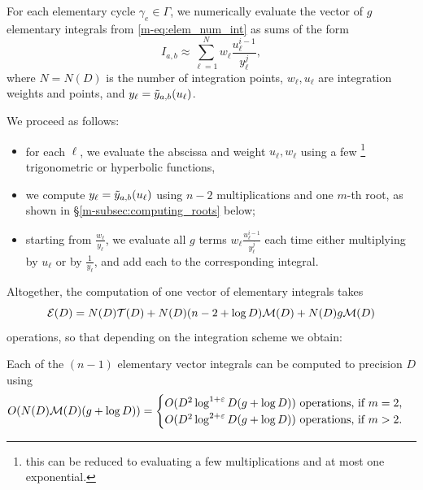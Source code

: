 \documentclass[main.tex]{subfiles}
\begin{document}
   For each elementary cycle $\gamma_e\in \Gamma$, we numerically evaluate the vector of $g$
   elementary integrals from \eqref{m-eq:elem_num_int} as sums of the form
   \begin{equation*}
       I_{a,b} \approx \sum_{\ell=1}^N w_\ell\frac{u_\ell^{i-1}}{y_\ell^j},
   \end{equation*}
   where $N = N(D)$ is the number of integration points, $w_\ell,u_\ell$ are integration weights and points,
   and $y_\ell=\tilde{y}_{a,b}(u_\ell)$.

   We proceed as follows:
   \begin{itemize}
   \item for each $\ell$, we evaluate the abscissa and weight $u_\ell,w_\ell$ using
       a few \footnote{this can be reduced to evaluating
           a few multiplications and at most one exponential.} trigonometric or hyperbolic functions,
   \item we compute $y_\ell=\tilde{y}_{a,b}(u_\ell)$ using $n-2$ multiplications and one $m$-th root,
       as shown in \S \ref{m-subsec:computing_roots} below;
   \item starting from $\frac{w_\ell}{y_\ell}$, we evaluate all $g$ terms $w_\ell\frac{u_\ell^{i-1}}{y_\ell^j}$
       each time either multiplying by $u_\ell$ or by $\frac{1}{y_\ell}$, and add each to the corresponding
       integral.
   \end{itemize}

   Altogether, the computation of one vector of elementary integrals takes
   \begin{equation}\label{eq:elem_int_complexity}
    \mathcal E(D) = N(D)\mathcal T(D)+N(D)(n-2+\log D)\mathcal M(D)+N(D)g\mathcal M(D)
   \end{equation}
    operations,
   so that depending on the integration scheme we obtain:
   \begin{thm}\label{thm:complexity_integrals}
       Each of the $(n-1)$ elementary vector integrals can be computed to precision $D$ using
       \begin{equation*}
           O(N(D)\mathcal M(D)(g+\log D)) =
           \begin{cases}
               O(D^2\log^{1+\varepsilon} D (g + \log D)) \text{ operations, if $m=2$,}\\
               O(D^2\log^{2+\varepsilon} D (g + \log D)) \text{ operations, if $m>2$.}
           \end{cases}
       \end{equation*}
   \end{thm}
\end{document}
